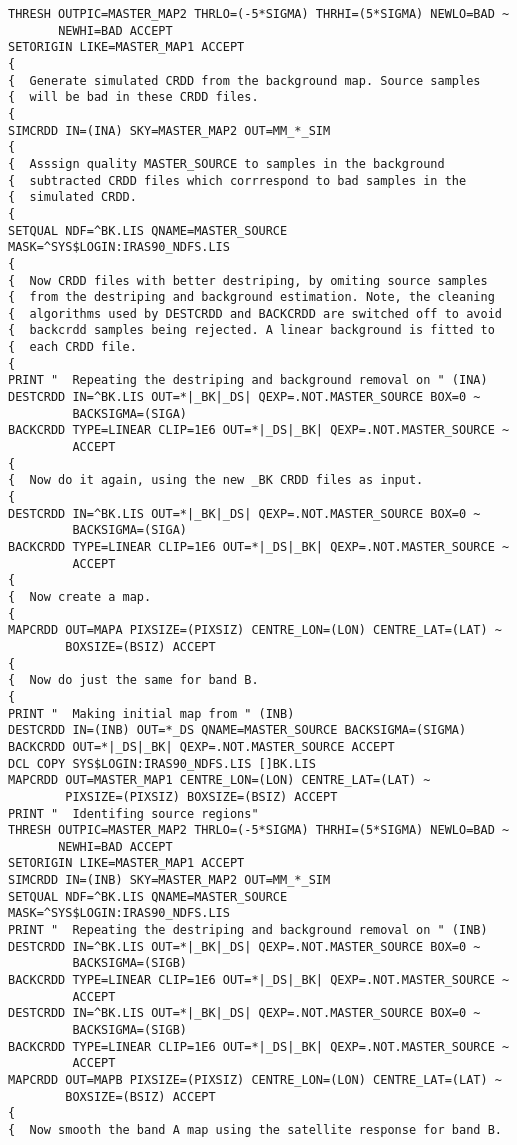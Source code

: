 \begin{verbatim}
THRESH OUTPIC=MASTER_MAP2 THRLO=(-5*SIGMA) THRHI=(5*SIGMA) NEWLO=BAD ~
       NEWHI=BAD ACCEPT
SETORIGIN LIKE=MASTER_MAP1 ACCEPT
{
{  Generate simulated CRDD from the background map. Source samples
{  will be bad in these CRDD files.
{
SIMCRDD IN=(INA) SKY=MASTER_MAP2 OUT=MM_*_SIM
{
{  Asssign quality MASTER_SOURCE to samples in the background
{  subtracted CRDD files which corrrespond to bad samples in the
{  simulated CRDD.
{
SETQUAL NDF=^BK.LIS QNAME=MASTER_SOURCE MASK=^SYS$LOGIN:IRAS90_NDFS.LIS
{
{  Now CRDD files with better destriping, by omiting source samples
{  from the destriping and background estimation. Note, the cleaning
{  algorithms used by DESTCRDD and BACKCRDD are switched off to avoid
{  backcrdd samples being rejected. A linear background is fitted to
{  each CRDD file.
{
PRINT "  Repeating the destriping and background removal on " (INA)
DESTCRDD IN=^BK.LIS OUT=*|_BK|_DS| QEXP=.NOT.MASTER_SOURCE BOX=0 ~
         BACKSIGMA=(SIGA)
BACKCRDD TYPE=LINEAR CLIP=1E6 OUT=*|_DS|_BK| QEXP=.NOT.MASTER_SOURCE ~
         ACCEPT
{
{  Now do it again, using the new _BK CRDD files as input.
{
DESTCRDD IN=^BK.LIS OUT=*|_BK|_DS| QEXP=.NOT.MASTER_SOURCE BOX=0 ~
         BACKSIGMA=(SIGA)
BACKCRDD TYPE=LINEAR CLIP=1E6 OUT=*|_DS|_BK| QEXP=.NOT.MASTER_SOURCE ~
         ACCEPT
{
{  Now create a map.
{
MAPCRDD OUT=MAPA PIXSIZE=(PIXSIZ) CENTRE_LON=(LON) CENTRE_LAT=(LAT) ~
        BOXSIZE=(BSIZ) ACCEPT
{
{  Now do just the same for band B.
{
PRINT "  Making initial map from " (INB)
DESTCRDD IN=(INB) OUT=*_DS QNAME=MASTER_SOURCE BACKSIGMA=(SIGMA)
BACKCRDD OUT=*|_DS|_BK| QEXP=.NOT.MASTER_SOURCE ACCEPT
DCL COPY SYS$LOGIN:IRAS90_NDFS.LIS []BK.LIS
MAPCRDD OUT=MASTER_MAP1 CENTRE_LON=(LON) CENTRE_LAT=(LAT) ~
        PIXSIZE=(PIXSIZ) BOXSIZE=(BSIZ) ACCEPT
PRINT "  Identifing source regions"
THRESH OUTPIC=MASTER_MAP2 THRLO=(-5*SIGMA) THRHI=(5*SIGMA) NEWLO=BAD ~
       NEWHI=BAD ACCEPT
SETORIGIN LIKE=MASTER_MAP1 ACCEPT
SIMCRDD IN=(INB) SKY=MASTER_MAP2 OUT=MM_*_SIM
SETQUAL NDF=^BK.LIS QNAME=MASTER_SOURCE MASK=^SYS$LOGIN:IRAS90_NDFS.LIS
PRINT "  Repeating the destriping and background removal on " (INB)
DESTCRDD IN=^BK.LIS OUT=*|_BK|_DS| QEXP=.NOT.MASTER_SOURCE BOX=0 ~
         BACKSIGMA=(SIGB)
BACKCRDD TYPE=LINEAR CLIP=1E6 OUT=*|_DS|_BK| QEXP=.NOT.MASTER_SOURCE ~
         ACCEPT
DESTCRDD IN=^BK.LIS OUT=*|_BK|_DS| QEXP=.NOT.MASTER_SOURCE BOX=0 ~
         BACKSIGMA=(SIGB)
BACKCRDD TYPE=LINEAR CLIP=1E6 OUT=*|_DS|_BK| QEXP=.NOT.MASTER_SOURCE ~
         ACCEPT
MAPCRDD OUT=MAPB PIXSIZE=(PIXSIZ) CENTRE_LON=(LON) CENTRE_LAT=(LAT) ~
        BOXSIZE=(BSIZ) ACCEPT
{
{  Now smooth the band A map using the satellite response for band B.

\end{verbatim}
